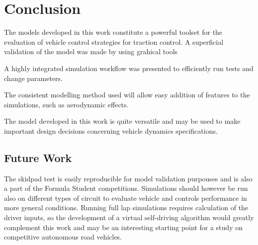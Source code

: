\chapter{Conclusion}
\label{chap:conclusion}
The models developed in this work constitute a powerful toolset for the evaluation of vehicle control strategies for traction control.
A superficial validation of the model was made by using grahical tools

A highly integrated simulation workflow was presented to efficiently run tests and change parameters.

The consistent modelling method used will allow easy addition of features to the simulations, such as aerodynamic effects.

The model developed in this work is quite versatile and may be used to make important design decisions concerning vehicle dynamics specifications.

\section{Future Work}
The skidpad test is easily reproducible for model validation purpouses and is also a part of the Formula Student competitions. Simulations should however be run also on different types of circuit to evaluate vehicle and controls performance in more general conditions.
Running full lap simulations requires calculation of the driver inputs, so the development of a virtual self-driving algorithm would greatly complement this work and may be an interesting starting point for a study on competitive autonomous road vehicles.
